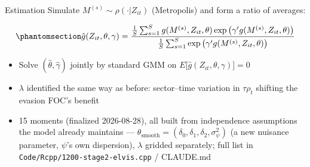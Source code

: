 \documentclass[
  ignorenonframetext,
  aspectratio=169,
]{beamer}
\providecommand{\tightlist}{%
  \setlength{\itemsep}{0pt}\setlength{\parskip}{0pt}}
\begin{document}
\begin{frame}[fragile]{Estimation}
\protect{}\label{estimation}
Simulate \(M^{(s)}\sim\rho(\cdot|Z_{it})\) (Metropolis) and form a ratio
of averages:

\begin{equation}\protect\phantomsection\label{eq-elvis-sim}{
\hat g(Z_{it},\theta,\gamma)=\frac{\frac1S\sum_{s=1}^S g(M^{(s)},Z_{it},\theta)\exp\big(\gamma'g(M^{(s)},Z_{it},\theta)\big)}{\frac1S\sum_{s=1}^S \exp\big(\gamma'g(M^{(s)},Z_{it},\theta)\big)}
}\end{equation}

\begin{itemize}
\tightlist
\item
  Solve \((\hat\theta,\hat\gamma)\) jointly by standard GMM on
  \(E\big[\hat g(Z_{it},\theta,\gamma)\big]=0\)
\item
  \(\lambda\) identified the same way as before: sector--time variation
  in \(\tau\rho_t\) shifting the evasion FOC's benefit
\item
  15 moments (finalized 2026-08-28), all built from independence
  assumptions the model already maintains ---
  \(\theta_{\text{smooth}}=(\delta_0,\delta_1,\delta_2,\sigma^2_\psi)\)
  (a new nuisance parameter, \(\psi\)'s own dispersion), \(\lambda\)
  gridded separately; full list in
  \texttt{Code/Rcpp/1200-stage2-elvis.cpp} / CLAUDE.md
\end{itemize}
\end{frame}
\end{document}
